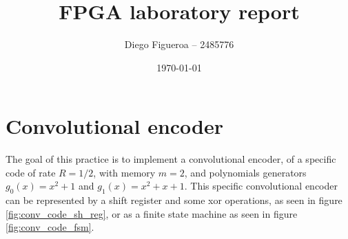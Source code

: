 \documentclass[12pt]{article}   	%
\title{FPGA laboratory report}
\author{Diego Figueroa -- 2485776}
\date{\today}							%
\begin{document}
\maketitle
\tableofcontents
\newpage
\listoffigures
\listoftables
\lstlistoflistings
\newpage
\section{Convolutional encoder}

The goal of this practice is to implement a convolutional encoder, of a specific code of rate $R=1/2$, with memory $m=2$, and polynomials generators $g_0(x) = x^2+1$ and $g_1(x)=x^2+x+1$. This specific convolutional encoder can be represented by a shift register and some xor operations, as seen in figure \ref{fig:conv_code_sh_reg}, or as a finite state machine as seen in figure \ref{fig:conv_code_fsm}.
\end{document}
